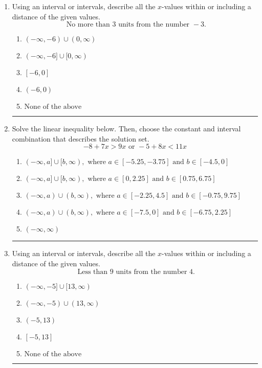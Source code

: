 \documentclass[14pt]{extbook}
\newcommand{\litem}[1]{\item#1\hspace*{-1cm}\rule{\textwidth}{0.4pt}}
\begin{document}
\begin{enumerate}
{\begin{enumerate}[label=\Alph*.]
\end{enumerate} }
\litem{
Using an interval or intervals, describe all the $x$-values within or including a distance of the given values.\[ \text{ No more than } 3 \text{ units from the number } -3. \]\begin{enumerate}[label=\Alph*.]
\item \( (-\infty, -6) \cup (0, \infty) \)
\item \( (-\infty, -6] \cup [0, \infty) \)
\item \( [-6, 0] \)
\item \( (-6, 0) \)
\item \( \text{None of the above} \)

\end{enumerate} }
\litem{
Solve the linear inequality below. Then, choose the constant and interval combination that describes the solution set.\[ -8 + 7 x > 9 x \text{ or } -5 + 8 x < 11 x \]\begin{enumerate}[label=\Alph*.]
\item \( (-\infty, a] \cup [b, \infty), \text{ where } a \in [-5.25, -3.75] \text{ and } b \in [-4.5, 0] \)
\item \( (-\infty, a] \cup [b, \infty), \text{ where } a \in [0, 2.25] \text{ and } b \in [0.75, 6.75] \)
\item \( (-\infty, a) \cup (b, \infty), \text{ where } a \in [-2.25, 4.5] \text{ and } b \in [-0.75, 9.75] \)
\item \( (-\infty, a) \cup (b, \infty), \text{ where } a \in [-7.5, 0] \text{ and } b \in [-6.75, 2.25] \)
\item \( (-\infty, \infty) \)

\end{enumerate} }
\litem{
Using an interval or intervals, describe all the $x$-values within or including a distance of the given values.\[ \text{ Less than } 9 \text{ units from the number } 4. \]\begin{enumerate}[label=\Alph*.]
\item \( (-\infty, -5] \cup [13, \infty) \)
\item \( (-\infty, -5) \cup (13, \infty) \)
\item \( (-5, 13) \)
\item \( [-5, 13] \)
\item \( \text{None of the above} \)


\end{enumerate}}
\end{enumerate}
\end{document}
